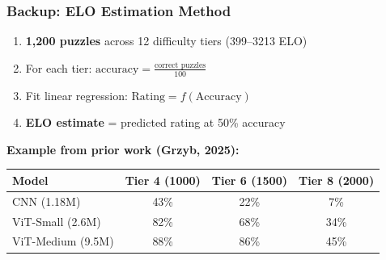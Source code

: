 \documentclass{beamer}
\begin{document}
\begin{frame}
\frametitle{Backup: ELO Estimation Method}

\begin{enumerate}
    \item \textbf{1,200 puzzles} across 12 difficulty tiers (399--3213 ELO)
    \item For each tier: $\text{accuracy} = \frac{\text{correct puzzles}}{100}$
    \item Fit linear regression: $\text{Rating} = f(\text{Accuracy})$
    \item \textbf{ELO estimate} = predicted rating at \alert{50\% accuracy}
\end{enumerate}

\vspace{1em}
\textbf{Example from prior work (Grzyb, 2025):}

\vspace{0.5em}
\begin{table}
\centering
\footnotesize
\begin{tabular}{lccc}
\toprule
\textbf{Model} & \textbf{Tier 4} (1000) & \textbf{Tier 6} (1500) & \textbf{Tier 8} (2000) \\
\midrule
CNN (1.18M) & 43\% & 22\% & 7\% \\
ViT-Small (2.6M) & 82\% & 68\% & 34\% \\
ViT-Medium (9.5M) & 88\% & 86\% & 45\% \\
\bottomrule
\end{tabular}
\end{table}

\end{frame}
\end{document}
